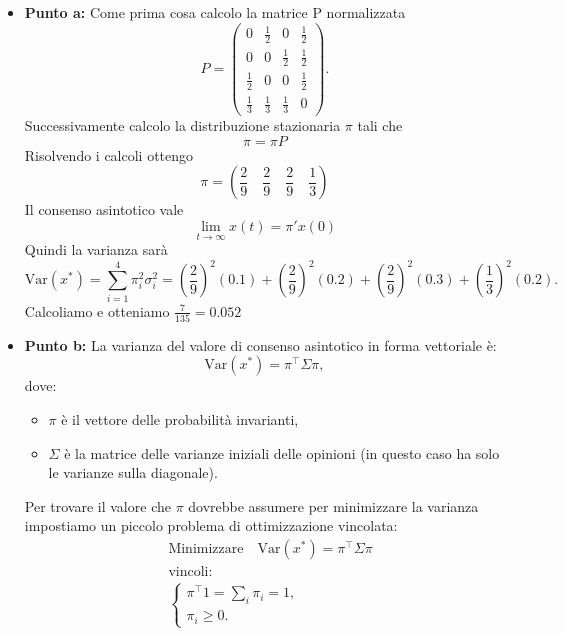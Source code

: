 \documentclass[a4paper,12pt]{article}
\begin{document}
	\begin{itemize}
		\item \textbf{Punto a: }
		Come prima cosa calcolo la matrice P normalizzata\\
		\[
		P = \begin{pmatrix}
			0 & \frac{1}{2} & 0 & \frac{1}{2} \\
			0 & 0 & \frac{1}{2} & \frac{1}{2} \\
			\frac{1}{2} & 0 & 0 & \frac{1}{2} \\
			\frac{1}{3} & \frac{1}{3} & \frac{1}{3} & 0
		\end{pmatrix}.
		\]
		Successivamente calcolo la distribuzione stazionaria $\pi$ tali che \\
		\[
		\pi = \pi P
		\]
		Risolvendo i calcoli ottengo\\
		\[
		\pi = \left( \frac{2}{9} \quad \frac{2}{9} \quad \frac{2}{9} \quad \frac{1}{3} \right)
		\]
		Il consenso asintotico vale\\
		\[
		\lim_{t \to \infty} x(t) = \pi' x(0)
		\]
		Quindi la varianza sarà\\
		\[
		\text{Var}(x^*) = \sum_{i=1}^4 \pi_i^2 \sigma_i^2 
		= \left( \frac{2}{9} \right)^2 (0.1) 
		+ \left( \frac{2}{9} \right)^2 (0.2) 
		+ \left( \frac{2}{9} \right)^2 (0.3) 
		+ \left( \frac{1}{3} \right)^2 (0.2).
		\]
		Calcoliamo e otteniamo $\frac{7}{135} = 0.052$
		\item \textbf{Punto b: }
		La varianza del valore di consenso asintotico in forma vettoriale è:
		\[
		\text{Var}(x^*) = \pi^\top \Sigma \pi,
		\]
		dove:
		\begin{itemize}
			\item \(\pi\) è il vettore delle probabilità invarianti,
			\item \(\Sigma\) è la matrice delle varianze iniziali delle opinioni (in questo caso ha solo le varianze sulla diagonale).
		\end{itemize}
		Per trovare il valore che $\pi$ dovrebbe assumere per minimizzare la varianza impostiamo un piccolo problema di ottimizzazione vincolata:\\
		\[
		\begin{aligned}
			& \text{Minimizzare} \quad \text{Var}(x^*) = \pi^\top \Sigma \pi \\
			& \text{vincoli:} \\
			& \begin{cases}
				\pi^\top 1 = \sum_i \pi_i = 1, \\
				\pi_i \geq 0.
			\end{cases}

\end{aligned}\]
\end{itemize}
\end{document}
